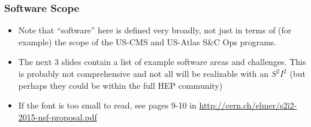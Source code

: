 \begin{frame}
\frametitle{Software Scope}
\begin{itemize}
\item Note that ``software'' here is defined very broadly, not just in terms of (for example) the scope of the US-CMS and US-Atlas S\&C Ops programs. 
\item The next 3 slides contain a list of example software areas and challenges. This is probably not comprehensive and not all will be realizable with an $ S^2 I^2 $ (but perhaps they could be within the full HEP community)
\item If the font is too small to read, see pages 9-10 in \url{http://cern.ch/elmer/s2i2-2015-nsf-proposal.pdf}
\end{itemize}

\end{frame}


